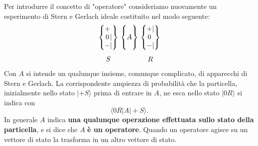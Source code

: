 \documentclass[a4paper,12pt,oneside]{book}
\begin{document}
Per introdurre il concetto di "operatore" consideriamo nuovamente un esperimento di Stern e Gerlach ideale costituito nel modo seguente:
	\begin{equation}
		\begin{matrix}
		\begin{Bmatrix}
 			\makebox[\widthof{$-$}]{$+$}\makebox[\widthof{$|$}]{$\ $} \\ \makebox[\widthof{$-$}]{$0$}|\\ - | 
		\end{Bmatrix} \\[0.7cm]
			S
		\end{matrix} \
		\begin{matrix}
		\begin{Bmatrix}
			 \makebox[\widthof{$A$}]{$\ $}\\ A \\ \makebox[\widthof{$A$}]{$\ $} 
		\end{Bmatrix}  \\[0.7cm]
			\
		\end{matrix}\
		\begin{matrix}
		\begin{Bmatrix}
			\makebox[\widthof{$-$}]{$+$} | \\ \makebox[\widthof{$-$}]{$0$}\makebox[\widthof{$|$}]{$\ $}\\ - | 
		\end{Bmatrix} \\[0.7cm]
			R
		\end{matrix}
	\end{equation}
Con $A$ si intende un qualunque insieme, comunque complicato, di apparecchi di Stern e Gerlach. La corrispondente ampiezza di probabilità che la particella, inizialmente nello stato $| +S \rangle$ prima di entrare in $A$, ne esca nello stato $| 0R \rangle$ si indica con
	\begin{equation}
		\langle 0R|A| +S \rangle .
	\end{equation}
In generale $A$ indica \textbf{una qualunque operazione effettuata sullo stato della particella}, e si dice che $A$ \textbf{è un operatore}. Quando un operatore agisce su un vettore di stato la trasforma in un altro vettore di stato.\\
\end{document}
